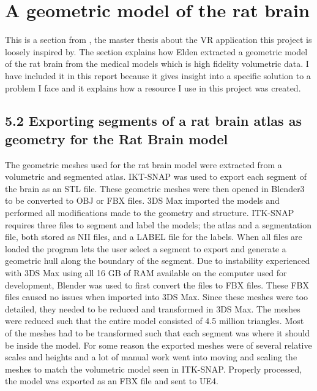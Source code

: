 
\chapter{A geometric model of the rat brain}\label{chap:elden}

This is a section from \citet{Elden2017}, the master thesis about  the VR application this project is loosely inspired by. The section explains how Elden extracted a geometric model of the rat brain from the medical models which is high fidelity volumetric data. I have included it in this report because it gives insight into a specific solution to a problem I face and it explains how a resource I use in this project was created.

\section*{5.2 Exporting segments of a rat brain atlas as geometry
for the Rat Brain model}
The geometric meshes used for the rat brain model were extracted from
a volumetric and segmented atlas. IKT-SNAP was used to export each
segment of the brain as an STL file. These geometric meshes were then
opened in Blender3
to be converted to OBJ or FBX files. 3DS Max imported
the models and performed all modifications made to the geometry and
structure.
ITK-SNAP requires three files to segment and label the models; the
atlas and a segmentation file, both stored as NII files, and a LABEL file
for the labels. When all files are loaded the program lets the user select a
segment to export and generate a geometric hull along the boundary of the
segment. Due to instability experienced with 3DS Max using all 16 GB of
RAM available on the computer used for development, Blender was used
to first convert the files to FBX files. These FBX files caused no issues when
imported into 3DS Max. Since these meshes were too detailed, they needed
to be reduced and transformed in 3DS Max. The meshes were reduced
such that the entire model consisted of 4.5 million triangles. Most of the
meshes had to be transformed such that each segment was where it should
be inside the model. For some reason the exported meshes were of several
relative scales and heights and a lot of manual work went into moving
and scaling the meshes to match the volumetric model seen in ITK-SNAP.
Properly processed, the model was exported as an FBX file and sent to UE4.
